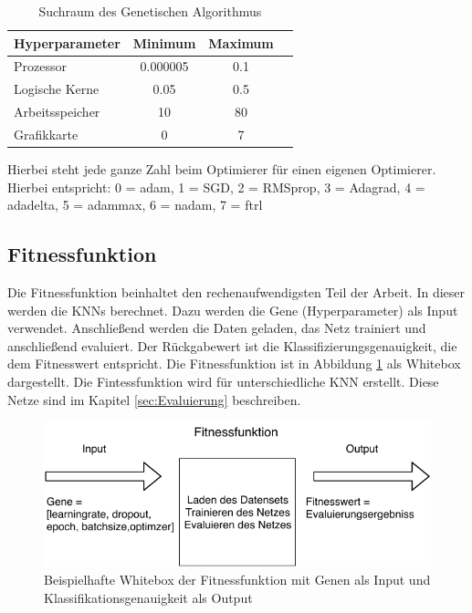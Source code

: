 \begin{table}[htb]
\centering
\caption{Suchraum des Genetischen Algorithmus}\label{tab:Rahmen}
\begin{tabular}{lccc}\toprule
\textbf{Hyperparameter}	&\textbf{Minimum}   &\textbf{Maximum}	\\\midrule
Prozessor		        & 0.000005          & 0.1 \\
Logische Kerne 	        & 0.05          	& 0.5 \\
Arbeitsspeicher     	& 10                & 80	\\
Grafikkarte		        & 0	                & 7	\\\bottomrule
\end{tabular}
\end{table}
Hierbei steht jede ganze Zahl beim Optimierer für einen eigenen Optimierer. Hierbei entspricht: 0 = adam, 1 = SGD, 2 = RMSprop, 3 = Adagrad, 4 = adadelta, 5 = adammax, 6 = nadam, 7 = ftrl


\subsection{Fitnessfunktion}\label{implementierung_Fitnessfunktion}
Die Fitnessfunktion beinhaltet den rechenaufwendigsten Teil der Arbeit. In dieser werden die KNNs berechnet. Dazu werden die Gene (Hyperparameter) als Input verwendet. Anschließend werden die Daten geladen, das Netz trainiert und anschließend evaluiert. Der Rückgabewert ist die Klassifizierungsgenauigkeit, die dem Fitnesswert entspricht. Die Fitnessfunktion ist in Abbildung \ref{fig:Fitnessfunktion} als Whitebox dargestellt. Die Fintessfunktion wird für unterschiedliche KNN erstellt. Diese Netze sind im Kapitel \ref{sec:Evaluierung} beschreiben.

\noindent%
\begin{figure}[H]
  \centering  
  \includegraphics[scale=1]{img/Fitnessfunction.pdf}
  \caption{Beispielhafte Whitebox der Fitnessfunktion mit Genen als Input und Klassifikationsgenauigkeit als Output}
  \label{fig:Fitnessfunktion}
\end{figure}  


